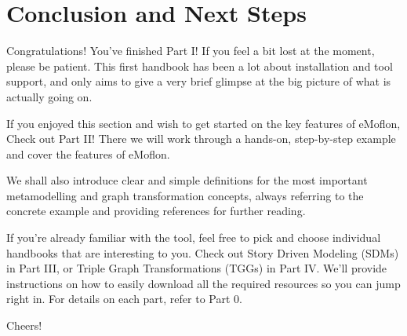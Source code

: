 \newpage
\genHeader

\vspace*{2cm}

\section{Conclusion and Next Steps}
\vspace{0.5cm}

Congratulations!\hypertarget{conclusion}{} You've finished Part I! If you feel a bit lost at the moment, please be patient. This first handbook has been a lot about installation and tool support, and only aims to give a very brief glimpse at the big picture of what is actually going on.  

If you enjoyed this section and wish to get started on the key features of eMoflon, Check out Part II! There we will work through a hands-on, step-by-step example and cover the features of eMoflon.

We shall also introduce clear and simple definitions for the most important metamodelling and graph transformation concepts, always referring to the concrete example and providing references for further reading.

If you're already familiar with the tool, feel free to pick and choose individual handbooks that are interesting to you. Check out Story Driven Modeling (SDMs) in Part III, or Triple Graph Transformations (TGGs) in Part IV. We'll provide instructions on how to easily download all the required resources so you can jump right in. For details on each part, refer to Part 0.

Cheers!
